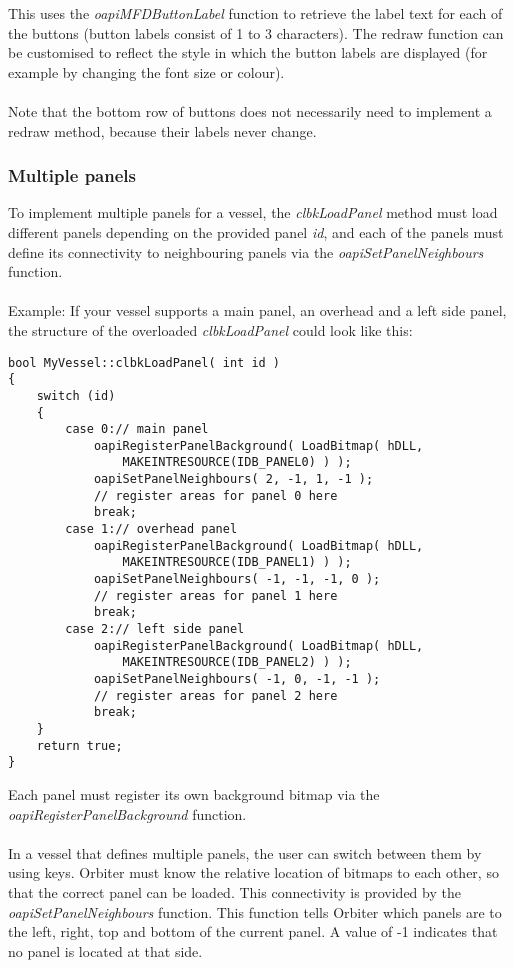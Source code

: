 \documentclass[Orbiter Developer Manual.tex]{subfiles}
\begin{document}
\noindent
This uses the \textit{oapiMFDButtonLabel} function to retrieve the label text for each of the buttons (button labels consist of 1 to 3 characters). The redraw function can be customised to reflect the style in which the button labels are displayed (for example by changing the font size or colour).\\
\\
Note that the bottom row of buttons does not necessarily need to implement a redraw method, because their labels never change.


\subsubsection{Multiple panels}
To implement multiple panels for a vessel, the \textit{clbkLoadPanel} method must load different panels depending on the provided panel \textit{id}, and each of the panels must define its connectivity to neighbouring panels via the \textit{oapiSetPanelNeighbours} function.\\
\\
Example: If your vessel supports a main panel, an overhead and a left side panel, the structure of the overloaded \textit{clbkLoadPanel} could look like this:

\begin{lstlisting}
bool MyVessel::clbkLoadPanel( int id )
{
	switch (id)
	{
		case 0:// main panel
			oapiRegisterPanelBackground( LoadBitmap( hDLL,
				MAKEINTRESOURCE(IDB_PANEL0) ) );
			oapiSetPanelNeighbours( 2, -1, 1, -1 );
			// register areas for panel 0 here
			break;
		case 1:// overhead panel
			oapiRegisterPanelBackground( LoadBitmap( hDLL,
				MAKEINTRESOURCE(IDB_PANEL1) ) );
			oapiSetPanelNeighbours( -1, -1, -1, 0 );
			// register areas for panel 1 here
			break;
		case 2:// left side panel
			oapiRegisterPanelBackground( LoadBitmap( hDLL,
				MAKEINTRESOURCE(IDB_PANEL2) ) );
			oapiSetPanelNeighbours( -1, 0, -1, -1 );
			// register areas for panel 2 here
			break;
	}
	return true;
}
\end{lstlisting}

\noindent
Each panel must register its own background bitmap via the \textit{oapiRegisterPanelBackground} function.\\
\\
In a vessel that defines multiple panels, the user can switch between them by using \Ctrl\DArrow\UArrow\RArrow\LArrow keys. Orbiter must know the relative location of bitmaps to each other, so that the correct panel can be loaded. This connectivity is provided by the \textit{oapiSetPanelNeighbours} function. This function tells Orbiter which panels are to the left, right, top and bottom of the current panel. A value of -1 indicates that no panel is located at that side.
\end{document}
